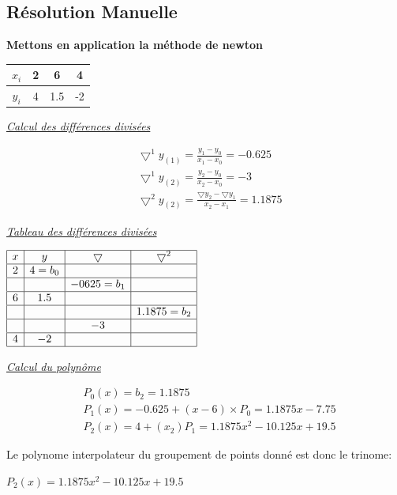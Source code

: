\documentclass{report}
\begin{document}
\subsection{Résolution Manuelle}
\begin{center}
    \textbf{Mettons en application la méthode de newton}\vspace{6pt}\\
\begin{tabular}{|c|c|c|c|}
    \hline
    $x_i$ & 2 & 6 & 4 \\
    \hline
    $y_i$ & 4 & 1.5 & -2\\
    \hline
\end{tabular}
\end{center}
\underline{\textit{Calcul des différences divisées}}\\
\begin{center}
    \begin{align*}
     &\bigtriangledown^{1}y_{(1)} = \frac{y_1 - y_0}{x_1-x_0} = -0.625 \\
     &\bigtriangledown^{1}y_{(2)} = \frac{y_2 - y_0}{x_2-x_0} = -3 \\
     &\bigtriangledown^{2}y_{(2)} = \frac{\bigtriangledown y_2 - \bigtriangledown y_1}{x_2-x_1} = 1.1875
    \end{align*}
\end{center}
\underline{\textit{Tableau des différences divisées}}\\
\begin{center}
$
\begin{array}{|c|c|c|c|}
\hline
x & y & \bigtriangledown & \bigtriangledown^2 \\
\hline
2 & 4 = b_0 &  & \\
\hline
& & -0625= b_1 &  \\ 
\hline
6 & 1.5&  & \\
\hline
& & & 1.1875 = b_2 \\
\hline
& &-3 & \\
\hline
4& -2 & & \\
\hline
\end{array}
$
\end{center}
\underline{\textit{Calcul du polynôme}}\\
\begin{center}
    \begin{align*}
    &P_0 (x) = b_2 = 1.1875 \\
    &P_1(x) = -0.625 + (x-6) \times P_0 = 1.1875x - 7.75 \\
    &P_2(x) = 4+ (x_2 )P_1 = 1.1875x^2-10.125x+19.5 
    \end{align*}
\end{center}
Le polynome interpolateur du groupement de points donné est donc le trinome:
\begin{center}
    $P_2(x)=1.1875x^2-10.125x+19.5$\\
\end{center}
\end{document}
